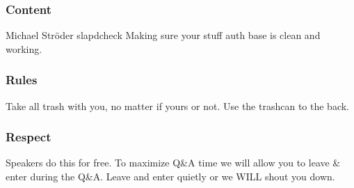 \documentclass[aspectratio=169]{beamer}
\begin{document}
\begin{frame}
	\frametitle{Content}
	\begin{center}
		\vfill
		Michael Ströder
		\vfill
		slapdcheck
		\vfill
		Making sure your stuff auth base is clean and working.
		\vfill
	\end{center}
\end{frame}

\begin{frame}
	\frametitle{Rules}
	\begin{center}
		\vfill
		Take all trash with you, no matter if yours or not.
		\vfill
		Use the trashcan to the back.
		\vfill
	\end{center}
\end{frame}

\begin{frame}
	\frametitle{Respect}
	\begin{center}
		\vfill
		Speakers do this for free.
		\vfill
		To maximize Q\&A time we will allow you to leave \& enter during the Q\&A.
		\vfill
		Leave and enter quietly or we WILL shout you down.
		\vfill
	\end{center}
\end{frame}


\end{document}
